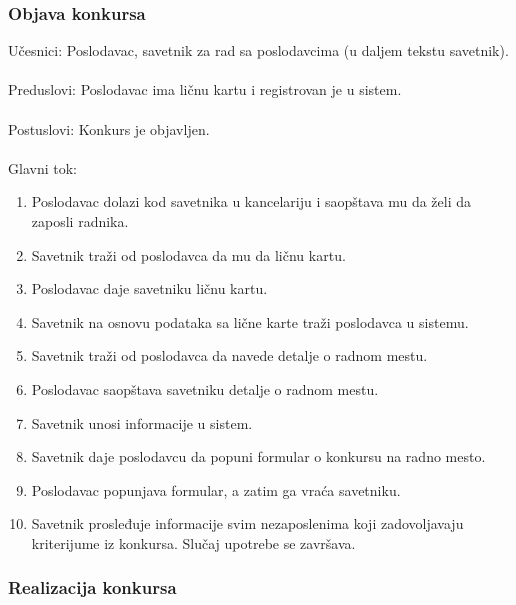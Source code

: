 \subsubsection{Objava konkursa}
\label{su: razgovor sa poslodavcem}

\noindent Učesnici: Poslodavac, savetnik za rad sa poslodavcima (u daljem tekstu savetnik).
\\
\\ Preduslovi: Poslodavac ima ličnu kartu i registrovan je u sistem.
\\
\\ Postuslovi: Konkurs je objavljen.
\\
\\ Glavni tok:
\begin{enumerate}
\item Poslodavac dolazi kod savetnika u kancelariju i saopštava mu da želi da zaposli radnika.
\item Savetnik traži od poslodavca da mu da ličnu kartu.
\item Poslodavac daje savetniku ličnu kartu.
\item Savetnik na osnovu podataka sa lične karte traži poslodavca u sistemu.
\item Savetnik traži od poslodavca da navede detalje o radnom mestu.
\item Poslodavac saopštava savetniku detalje o radnom mestu.
\item Savetnik unosi informacije u sistem.
\item Savetnik daje poslodavcu da popuni formular o konkursu na radno mesto.
\item Poslodavac popunjava formular, a zatim ga vraća savetniku.
\item Savetnik prosleđuje informacije svim nezaposlenima koji zadovoljavaju kriterijume iz konkursa. Slučaj upotrebe se završava.
\end{enumerate}

\subsubsection{Realizacija konkursa}

